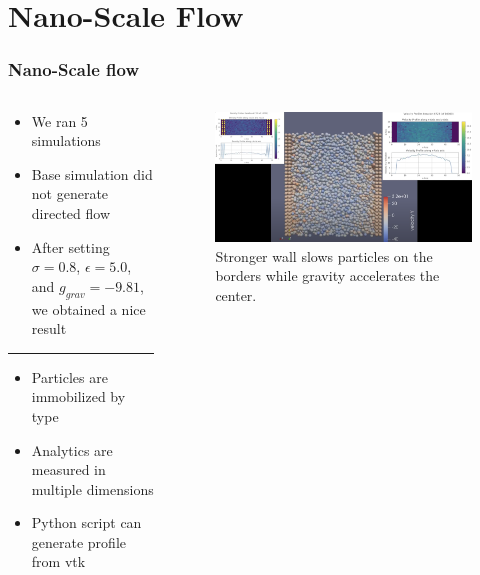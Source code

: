 \section{Nano-Scale Flow}
\label{sec:nano}

\begin{frame}
    \frametitle{Nano-Scale flow}
    
    \begin{columns}
        \begin{column}{0.3\textwidth}
            \begin{itemize}
                \item We ran 5 simulations
                \item Base simulation did not generate directed flow
                \item After setting $\sigma = 0.8$, $\epsilon = 5.0$, and $g_{grav}=-9.81$, we obtained a nice result
            \end{itemize}

            \vspace{7pt}
            \hrule
            \vspace{7pt}

            \begin{itemize}
                \item Particles are immobilized by type
                \item Analytics are measured in multiple dimensions
                \item Python script can generate profile from vtk
            \end{itemize}
        \end{column}
        \begin{column}{.7\textwidth}
            \begin{figure}
                \includegraphics[width=\columnwidth]{../../res/Stronger_walls_nano_flow.png}
                \caption{Stronger wall slows particles on the borders while gravity accelerates the center.}
                \label{fig:strong-walls}
            \end{figure}
        \end{column}
    \end{columns}
    
    
\end{frame}